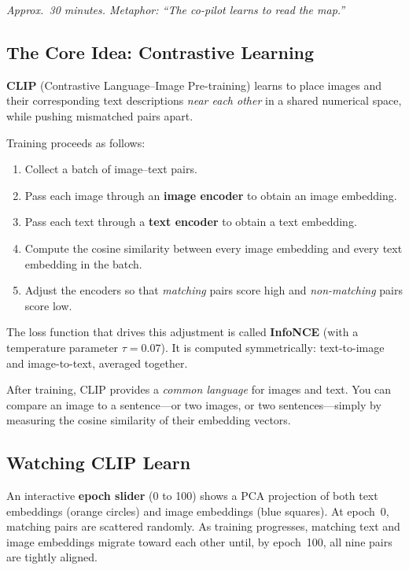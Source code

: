 \documentclass[11pt,a4paper]{article}
\begin{document}
\textit{Approx.\ 30 minutes.  Metaphor: ``The co-pilot learns to read
the map.''}

\subsection{The Core Idea: Contrastive Learning}

\textbf{CLIP} (Contrastive Language--Image Pre-training) learns to place
images and their corresponding text descriptions \emph{near each other}
in a shared numerical space, while pushing mismatched pairs apart.

Training proceeds as follows:

\begin{enumerate}[nosep]
  \item Collect a batch of image--text pairs.
  \item Pass each image through an \textbf{image encoder} to obtain an
        image embedding.
  \item Pass each text through a \textbf{text encoder} to obtain a text
        embedding.
  \item Compute the cosine similarity between every image embedding and
        every text embedding in the batch.
  \item Adjust the encoders so that \emph{matching} pairs score high and
        \emph{non-matching} pairs score low.
\end{enumerate}

The loss function that drives this adjustment is called \textbf{InfoNCE}
(with a temperature parameter $\tau = 0.07$).  It is computed
symmetrically: text-to-image and image-to-text, averaged together.

\begin{keyinsight}
After training, CLIP provides a \emph{common language} for images and
text.  You can compare an image to a sentence---or two images, or two
sentences---simply by measuring the cosine similarity of their embedding
vectors.
\end{keyinsight}

\subsection{Watching CLIP Learn}

An interactive \textbf{epoch slider} (0 to 100) shows a PCA projection
of both text embeddings (orange circles) and image embeddings (blue
squares).  At epoch~0, matching pairs are scattered randomly.  As
training progresses, matching text and image embeddings migrate toward
each other until, by epoch~100, all nine pairs are tightly aligned.
\end{document}
